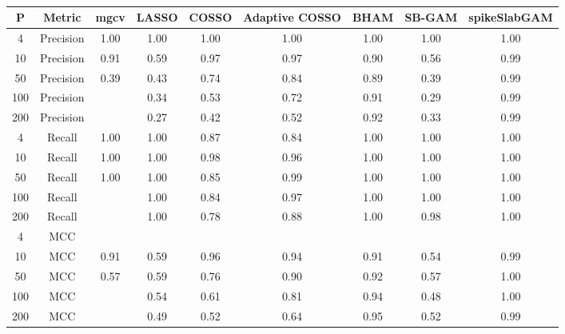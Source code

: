 \begin{table}[ht]
\centering
\begin{tabular}{ccccccccc}
  \hline
P & Metric & mgcv & LASSO & COSSO & Adaptive COSSO & BHAM & SB-GAM & spikeSlabGAM \\ 
  \hline
  4 & Precision & 1.00 & 1.00 & 1.00 & 1.00 & 1.00 & 1.00 & 1.00 \\ 
   10 & Precision & 0.91 & 0.59 & 0.97 & 0.97 & 0.90 & 0.56 & 0.99 \\ 
   50 & Precision & 0.39 & 0.43 & 0.74 & 0.84 & 0.89 & 0.39 & 0.99 \\ 
  100 & Precision &  & 0.34 & 0.53 & 0.72 & 0.91 & 0.29 & 0.99 \\ 
  200 & Precision &  & 0.27 & 0.42 & 0.52 & 0.92 & 0.33 & 0.99 \\ 
    4 & Recall & 1.00 & 1.00 & 0.87 & 0.84 & 1.00 & 1.00 & 1.00 \\ 
   10 & Recall & 1.00 & 1.00 & 0.98 & 0.96 & 1.00 & 1.00 & 1.00 \\ 
   50 & Recall & 1.00 & 1.00 & 0.85 & 0.99 & 1.00 & 1.00 & 1.00 \\ 
  100 & Recall &  & 1.00 & 0.84 & 0.97 & 1.00 & 1.00 & 1.00 \\ 
  200 & Recall &  & 1.00 & 0.78 & 0.88 & 1.00 & 0.98 & 1.00 \\ 
    4 & MCC &  &  &  &  &  &  &  \\ 
   10 & MCC & 0.91 & 0.59 & 0.96 & 0.94 & 0.91 & 0.54 & 0.99 \\ 
   50 & MCC & 0.57 & 0.59 & 0.76 & 0.90 & 0.92 & 0.57 & 1.00 \\ 
  100 & MCC &  & 0.54 & 0.61 & 0.81 & 0.94 & 0.48 & 1.00 \\ 
  200 & MCC &  & 0.49 & 0.52 & 0.64 & 0.95 & 0.52 & 0.99 \\ 
   \hline
\end{tabular}
\caption{} 
\label{}
\end{table}
